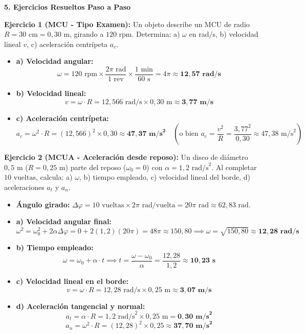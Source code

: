 ﻿\documentclass[11pt,a4paper]{article}
\begin{document}
\newpage

\noindent\textbf{5. Ejercicios Resueltos Paso a Paso}

\vspace{0.2cm}
\noindent\textbf{Ejercicio 1 (MCU - Tipo Examen):} Un objeto describe un MCU de radio $R = 30\text{ cm} = 0{,}30\text{ m}$, girando a $120\text{ rpm}$. Determina: a) $\omega$ en rad/s, b) velocidad lineal $v$, c) aceleración centrípeta $a_c$.

\begin{itemize}[leftmargin=1.5em, itemsep=3pt]
    \item \textbf{a) Velocidad angular:}
    \[
    \omega = 120\text{ rpm} \times \frac{2\pi\text{ rad}}{1\text{ rev}} \times \frac{1\text{ min}}{60\text{ s}} = 4\pi \approx \mathbf{12{,}57\text{ rad/s}}
    \]
    \item \textbf{b) Velocidad lineal:}
    \[
    v = \omega \cdot R = 12{,}566\text{ rad/s} \times 0{,}30\text{ m} \approx \mathbf{3{,}77\text{ m/s}}
    \]
    \item \textbf{c) Aceleración centrípeta:}
    \[
    a_c = \omega^2 \cdot R = (12{,}566)^2 \times 0{,}30 \approx \mathbf{47{,}37\text{ m/s}^2} \quad \left(\text{o bien } a_c = \frac{v^2}{R} = \frac{3{,}77^2}{0{,}30} \approx 47{,}38\text{ m/s}^2\right)
    \]
\end{itemize}

\vspace{0.3cm}
\noindent\textbf{Ejercicio 2 (MCUA - Aceleración desde reposo):} Un disco de diámetro $0{,}5\text{ m}$ ($R = 0{,}25\text{ m}$) parte del reposo ($\omega_0 = 0$) con $\alpha = 1{,}2\text{ rad/s}^2$. Al completar $10\text{ vueltas}$, calcula: a) $\omega$, b) tiempo empleado, c) velocidad lineal del borde, d) aceleraciones $a_t$ y $a_n$.

\begin{itemize}[leftmargin=1.5em, itemsep=3pt]
    \item \textbf{Ángulo girado:} $\Delta\varphi = 10\text{ vueltas} \times 2\pi\text{ rad/vuelta} = 20\pi\text{ rad} \approx 62{,}83\text{ rad}$.
    \item \textbf{a) Velocidad angular final:}
    \[
    \omega^2 = \omega_0^2 + 2\alpha\Delta\varphi = 0 + 2(1{,}2)(20\pi) = 48\pi \approx 150{,}80 \implies \omega = \sqrt{150{,}80} \approx \mathbf{12{,}28\text{ rad/s}}
    \]
    \item \textbf{b) Tiempo empleado:}
    \[
    \omega = \omega_0 + \alpha \cdot t \implies t = \frac{\omega - \omega_0}{\alpha} = \frac{12{,}28}{1{,}2} \approx \mathbf{10{,}23\text{ s}}
    \]
    \item \textbf{c) Velocidad lineal en el borde:}
    \[
    v = \omega \cdot R = 12{,}28\text{ rad/s} \times 0{,}25\text{ m} \approx \mathbf{3{,}07\text{ m/s}}
    \]
    \item \textbf{d) Aceleración tangencial y normal:}
    \[
    a_t = \alpha \cdot R = 1{,}2\text{ rad/s}^2 \times 0{,}25\text{ m} = \mathbf{0{,}30\text{ m/s}^2}
    \]
    \[
    a_n = \omega^2 \cdot R = (12{,}28)^2 \times 0{,}25 \approx \mathbf{37{,}70\text{ m/s}^2}
    \]
\end{itemize}
\end{document}
